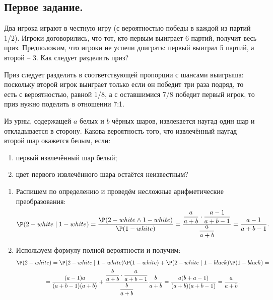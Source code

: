 \subsection{Первое задание.}
\begin{problem}[4]
    Два игрока играют в честную игру (с вероятностью победы в каждой из партий 1/2).
    Игроки договорились, что тот, кто первым выиграет 6 партий, получит весь приз.
    Предположим, что игроки не успели доиграть: первый выиграл 5 партий, а второй -- 3.
    Как следует разделить приз?
\end{problem}
\begin{solution}
    Приз следует разделить в соответствующей пропорции с шансами выигрыша: поскольку второй игрок выиграет только если он победит три раза подряд, то есть с вероятностью, равной 1/8, а с оставшимися 7/8 победит первый игрок, то приз нужно поделить в отношении 7:1.
\end{solution}
\begin{problem}[7]
    Из урны, содержащей $a$ белых и $b$ чёрных шаров, извлекается наугад один шар и откладывается в сторону.
    Какова вероятность того, что извлечённый наугад второй шар окажется белым, если:
    \begin{enumerate}
        \item первый извлечённый шар белый;
        \item цвет первого извлечённого шара остаётся неизвестным?
    \end{enumerate}
\end{problem}
\begin{solution} \leavevmode
    \begin{enumerate}
        \item Распишем по определению и проведём несложные арифметические преобразования:
        \[
            \P(2 - white \mid 1 - white) = \dfrac{\P(2 - white \wedge 1 -  white)}{\P(1 - white)} = \dfrac{\dfrac{a}{a + b}\cdot \dfrac{a - 1}{a + b - 1}}{\dfrac{a}{a + b}} = \dfrac{a - 1}{a + b - 1}.
        \]
        \item Используем формулу полной вероятности и получим:
        \begin{multline*}
            \P(2 - white) = \P(2 - white \mid 1 - white)\P(1 - white) + \P(2 - white \mid 1 - black)\P(1 - black) = \\ =
            \dfrac{(a - 1)a}{(a + b - 1)(a + b)} + \dfrac{\dfrac{b}{a + b}\cdot \dfrac{a}{a + b - 1}}{\dfrac{b}{a + b}}\dfrac{b}{a + b} = \dfrac{a(b + a - 1)}{(a + b)(a + b - 1)} = \dfrac{a}{a + b}.
        \end{multline*}
    \end{enumerate}
\end{solution}
